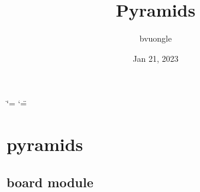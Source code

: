 \documentclass[letterpaper,10pt,english]{sphinxmanual}
\title{Pyramids}
\date{Jan 21, 2023}
\author{bvuongle}
\begin{document}
\ifdefined\shorthandoff
  \ifnum\catcode`\=\string=\active\shorthandoff{=}\fi
  \ifnum\catcode`\"=\active{}\fi
\fi

\pagestyle{empty}
\sphinxmaketitle
\pagestyle{plain}
\sphinxtableofcontents
\pagestyle{normal}
\label{\detokenize{index::doc}}


\sphinxstepscope


\chapter{pyramids}
\label{\detokenize{modules:pyramids}}\label{\detokenize{modules::doc}}
\sphinxstepscope


\section{board module}
\label{\detokenize{board:module-board}}\label{\detokenize{board:board-module}}\label{\detokenize{board::doc}}
\end{document}
